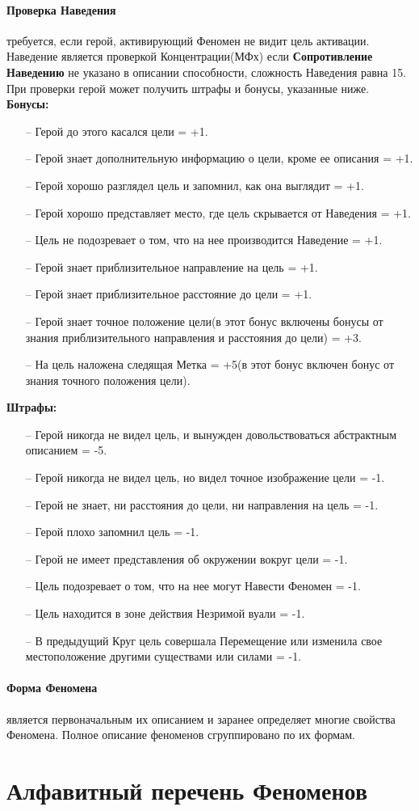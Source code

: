 \paragraph{Проверка Наведения} требуется, если герой, активирующий Феномен не видит цель активации. Наведение является проверкой Концентрации(МФх) если \textbf{Сопротивление Наведению} не указано в описании способности, сложность Наведения равна 15. При проверки герой может получить штрафы и бонусы, указанные ниже.
\newline
\textbf{Бонусы:}
\begin{itemize}
\item[--]Герой до этого касался цели = +1.
\item[--]Герой знает дополнительную информацию о цели, кроме ее описания = +1.
\item[--]Герой хорошо разглядел цель и запомнил, как она выглядит = +1.
\item[--]Герой хорошо представляет место, где цель скрывается от Наведения = +1.
\item[--]Цель не подозревает о том, что на нее производится Наведение = +1.
\item[--]Герой знает приблизительное направление на цель = +1.
\item[--]Герой знает приблизительное расстояние до цели = +1.
\item[--]Герой знает точное положение цели(в этот бонус включены бонусы от знания приблизительного направления и расстояния до цели) = +3.
\item[--]На цель наложена следящая Метка = +5(в этот бонус включен бонус от знания точного положения цели).

\end{itemize}
\textbf{Штрафы:}
\begin{itemize}
\item[--]Герой никогда не видел цель, и вынужден довольствоваться абстрактным описанием = -5.
\item[--]Герой никогда не видел цель, но видел точное изображение цели = -1.
\item[--]Герой не знает, ни расстояния до цели, ни направления на цель = -1.
\item[--]Герой плохо запомнил цель = -1.
\item[--]Герой не имеет представления об окружении вокруг цели = -1.
\item[--]Цель подозревает о том, что на нее могут Навести Феномен = -1.
\item[--]Цель находится в зоне действия Незримой вуали = -1.
\item[--]В предыдущий Круг цель совершала Перемещение или изменила свое местоположение другими существами или силами = -1.
\end{itemize}

\paragraph{Форма Феномена} является первоначальным их описанием и заранее определяет многие свойства Феномена.
\newline Полное описание феноменов сгруппировано по их формам.


\section{Алфавитный перечень Феноменов}
\printindex[powers]

